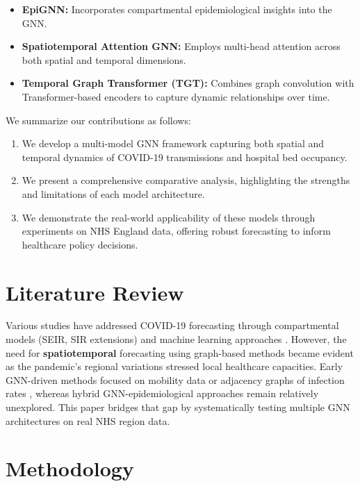 \documentclass[lettersize, journal]{IEEEtran}
\begin{document}
\begin{itemize}
    \item \textbf{EpiGNN:} Incorporates compartmental epidemiological insights into the GNN.
    \item \textbf{Spatiotemporal Attention GNN:} Employs multi-head attention across both spatial and temporal dimensions.
    \item \textbf{Temporal Graph Transformer (TGT):} Combines graph convolution with Transformer-based encoders to capture dynamic relationships over time.
\end{itemize}

We summarize our contributions as follows:
\begin{enumerate}
    \item We develop a multi-model GNN framework capturing both spatial and temporal dynamics of COVID-19 transmissions and hospital bed occupancy.
    \item We present a comprehensive comparative analysis, highlighting the strengths and limitations of each model architecture.
    \item We demonstrate the real-world applicability of these models through experiments on NHS England data, offering robust forecasting to inform healthcare policy decisions.
\end{enumerate}

\section{Literature Review}
Various studies have addressed COVID-19 forecasting through compartmental models (SEIR, SIR extensions) and machine learning approaches \cite{compartmentalmodel, sirbasedmodel}. However, the need for \textbf{spatiotemporal} forecasting using graph-based methods became evident as the pandemic’s regional variations stressed local healthcare capacities. Early GNN-driven methods focused on mobility data or adjacency graphs of infection rates \cite{gnncovid}, whereas hybrid GNN-epidemiological approaches remain relatively unexplored. This paper bridges that gap by systematically testing multiple GNN architectures on real NHS region data.

\section{Methodology}
\end{document}
